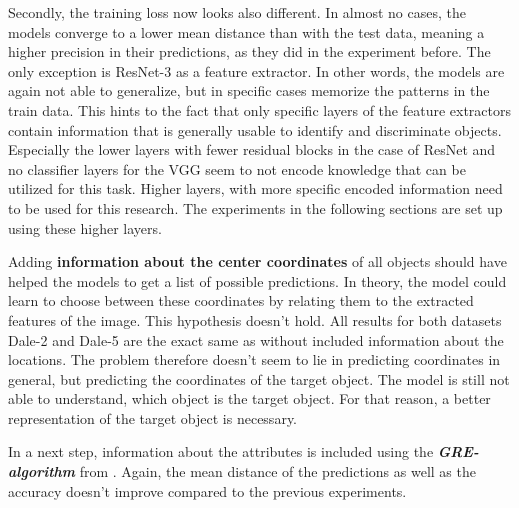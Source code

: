 Secondly, the training loss now looks also different.
In almost no cases, the models converge to a lower mean distance than with the test data, meaning a higher precision in their predictions, as they did in the experiment before.
The only exception is ResNet-3 as a feature extractor.
In other words, the models are again not able to generalize, but in specific cases memorize the patterns in the train data.
This hints to the fact that only specific layers of the feature extractors contain information that is generally usable to identify and discriminate objects.
Especially the lower layers with fewer residual blocks in the case of ResNet and no classifier layers for the VGG seem to not encode knowledge that can be utilized for this task.
Higher layers, with more specific encoded information need to be used for this research.
The experiments in the following sections are set up using these higher layers.

Adding \textbf{information about the center coordinates} of all objects should have helped the models to get a list of possible predictions.
In theory, the model could learn to choose between these coordinates by relating them to the extracted features of the image.
This hypothesis doesn't hold.
All results for both datasets Dale-2 and Dale-5 are the exact same as without included information about the locations.
The problem therefore doesn't seem to lie in predicting coordinates in general, but predicting the coordinates of the target object.
The model is still not able to understand, which object is the target object.
For that reason, a better representation of the target object is necessary.

In a next step, information about the attributes is included using the \textbf{\emph{GRE-algorithm}} from \citet{Dale1995}.
Again, the mean distance of the predictions as well as the accuracy doesn't improve compared to the previous experiments.

